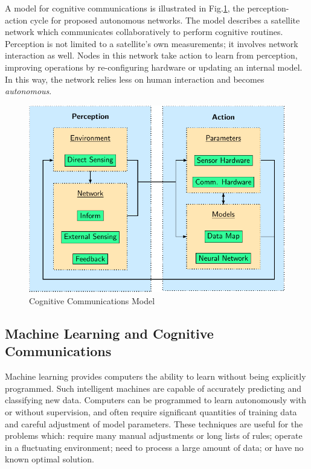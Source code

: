 \documentclass[conference]{IEEEtran}
\begin{document}
A model for cognitive communications is illustrated in Fig.\ref{fig:model}, the perception-action cycle for proposed autonomous networks.  The model describes a satellite network which communicates collaboratively to perform cognitive routines.  Perception is not limited to a satellite's own measurements; it involves network interaction as well.  Nodes in this network take action to learn from perception, improving operations by re-configuring hardware or updating an internal model.  In this way, the network relies less on human interaction and becomes \textit{autonomous}.

\begin{figure}[t]
  \centerline{\includegraphics[width=0.9\linewidth]
    {images/working/flowchart.pdf}
  }
  \caption{Cognitive Communications Model}
  \label{fig:model}
\end{figure}

\subsection{Machine Learning and Cognitive Communications}
\label{ssec:ml}

Machine learning provides computers the ability to learn without being explicitly programmed.  Such intelligent machines are capable of accurately predicting and classifying new data.  Computers can be programmed to learn autonomously with or without supervision, and often require significant quantities of training data and careful adjustment of model parameters.  These techniques are useful for the problems which: require many manual adjustments or long lists of rules; operate in a fluctuating environment; need to process a large amount of data; or have no known optimal solution.
\end{document}
